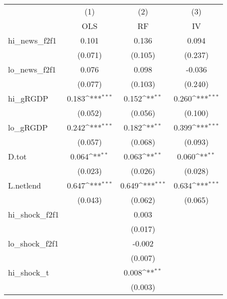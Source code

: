 {
\def\sym#1{\ifmmode^{#1}\else\(^{#1}\)\fi}
\begin{tabular}{l*{3}{c}}
\toprule
            &\multicolumn{1}{c}{(1)}&\multicolumn{1}{c}{(2)}&\multicolumn{1}{c}{(3)}\\
            &\multicolumn{1}{c}{OLS}&\multicolumn{1}{c}{RF}&\multicolumn{1}{c}{IV}\\
\midrule
hi\_news\_f2f1&       0.101         &       0.136         &       0.094         \\
            &     (0.071)         &     (0.105)         &     (0.237)         \\
\addlinespace
lo\_news\_f2f1&       0.076         &       0.098         &      -0.036         \\
            &     (0.077)         &     (0.103)         &     (0.240)         \\
\addlinespace
hi\_gRGDP    &       0.183\sym{***}&       0.152\sym{**} &       0.260\sym{***}\\
            &     (0.052)         &     (0.056)         &     (0.100)         \\
\addlinespace
lo\_gRGDP    &       0.242\sym{***}&       0.182\sym{**} &       0.399\sym{***}\\
            &     (0.057)         &     (0.068)         &     (0.093)         \\
\addlinespace
D.tot       &       0.064\sym{**} &       0.063\sym{**} &       0.060\sym{**} \\
            &     (0.023)         &     (0.026)         &     (0.028)         \\
\addlinespace
L.netlend   &       0.647\sym{***}&       0.649\sym{***}&       0.634\sym{***}\\
            &     (0.043)         &     (0.062)         &     (0.065)         \\
\addlinespace
hi\_shock\_f2f1&                     &       0.003         &                     \\
            &                     &     (0.017)         &                     \\
\addlinespace
lo\_shock\_f2f1&                     &      -0.002         &                     \\
            &                     &     (0.007)         &                     \\
\addlinespace
hi\_shock\_t  &                     &       0.008\sym{**} &                     \\
            &                     &     (0.003)         &                     \\

\end{tabular}}

